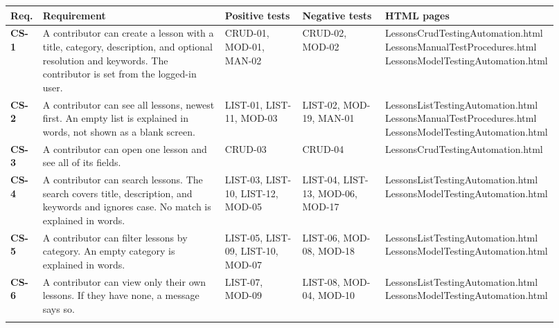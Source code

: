 \setlength{\tabcolsep}{4pt}\begin{longtable}{@{}>{\raggedright\arraybackslash}p{0.055\linewidth} >{\raggedright\arraybackslash}p{0.33\linewidth} >{\raggedright\arraybackslash}p{0.14\linewidth} >{\raggedright\arraybackslash}p{0.15\linewidth} >{\raggedright\arraybackslash}p{0.245\linewidth}@{}}
\toprule
\textbf{Req.} & \textbf{Requirement} & \textbf{Positive tests} & \textbf{Negative tests} & \textbf{HTML pages} \\
\midrule
\endhead
\textbf{CS-1} & A contributor can create a lesson with a title, category, description, and optional resolution and keywords. The contributor is set from the logged-in user. & CRUD-01, MOD-01, MAN-02 & CRUD-02, MOD-02 & \scriptsize LessonsCrudTestingAutomation.html \newline LessonsManualTestProcedures.html \newline LessonsModelTestingAutomation.html \\ \addlinespace[3pt]
\textbf{CS-2} & A contributor can see all lessons, newest first. An empty list is explained in words, not shown as a blank screen. & LIST-01, LIST-11, MOD-03 & LIST-02, MOD-19, MAN-01 & \scriptsize LessonsListTestingAutomation.html \newline LessonsManualTestProcedures.html \newline LessonsModelTestingAutomation.html \\ \addlinespace[3pt]
\textbf{CS-3} & A contributor can open one lesson and see all of its fields. & CRUD-03 & CRUD-04 & \scriptsize LessonsCrudTestingAutomation.html \\ \addlinespace[3pt]
\textbf{CS-4} & A contributor can search lessons. The search covers title, description, and keywords and ignores case. No match is explained in words. & LIST-03, LIST-10, LIST-12, MOD-05 & LIST-04, LIST-13, MOD-06, MOD-17 & \scriptsize LessonsListTestingAutomation.html \newline LessonsModelTestingAutomation.html \\ \addlinespace[3pt]
\textbf{CS-5} & A contributor can filter lessons by category. An empty category is explained in words. & LIST-05, LIST-09, LIST-10, MOD-07 & LIST-06, MOD-08, MOD-18 & \scriptsize LessonsListTestingAutomation.html \newline LessonsModelTestingAutomation.html \\ \addlinespace[3pt]
\textbf{CS-6} & A contributor can view only their own lessons. If they have none, a message says so. & LIST-07, MOD-09 & LIST-08, MOD-04, MOD-10 & \scriptsize LessonsListTestingAutomation.html \newline LessonsModelTestingAutomation.html \\ \addlinespace[3pt]

\end{longtable}
